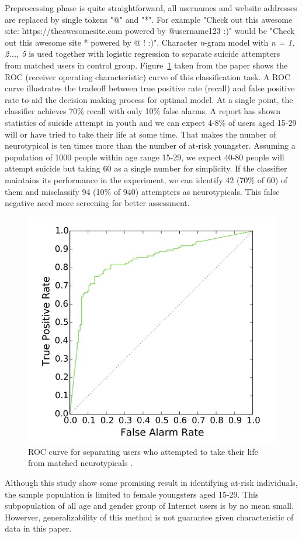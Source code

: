Preprocessing phase is quite straightforward, all usernames and website addresses are replaced by single tokens "@" and "*". For example "Check out this awesome site: https://theawesomesite.com powered by @username123 :)" would be "Check out this awesome site * powered by @ ! :)". Character \textit{n}-gram model with \textit{n = 1, 2..., 5} is used together with logistic regression to separate suicide attempters from matched users in control group. Figure~\ref{fig:roc_curve} taken from the paper \cite{Coppersmith2016} shows the ROC (receiver operating characteristic) curve of this classification task. A ROC curve illustrates the tradeoff between true positive rate (recall) and false positive rate to aid the decision making process for optimal model. At a single point, the classifier achieves 70\% recall with only 10\% false alarms. A report \cite{Kann2016} has shown statistics of suicide attempt in youth and we can expect 4-8\% of users aged 15-29 will or have tried to take their life at some time. That makes the number of neurotypical is ten times more than the number of at-risk youngster. Assuming a population of 1000 people within age range 15-29, we expect 40-80 people will attempt suicide but taking 60 as a single number for simplicity. If the classifier maintains its performance in the experiment, we can identify 42 (70\% of 60) of them and misclassify 94 (10\% of 940) attempters as neurotypicals. This false negative need more screening for better assessment.
\begin{figure}
\centering
\includegraphics[width=\textwidth, clip=true]{img/ROC_curve}
\caption{ROC curve for separating users who attempted to take their life from matched neurotypicals \cite{Coppersmith2016}.} 
\label{fig:roc_curve}
\end{figure}
Although this study show some promising result in identifying at-risk individuals, the sample population is limited to female youngsters aged 15-29. This subpopulation of all age and gender group of Internet users is by no mean small. Howerver, generalizability of this method is not guarantee given characteristic of data in this paper.\\
